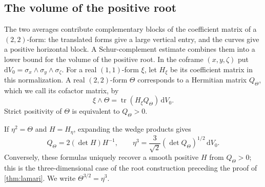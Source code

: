 \subsection{The volume of the positive root}

The two averages contribute complementary blocks of the coefficient matrix of a $(2,2)$-form: the translated forms give a large vertical entry, and the curves give a positive horizontal block. A Schur-complement estimate combines them into a lower bound for the volume of the positive root. In the coframe $(x,y,\zeta)$ put
$\mathrm{d}V_0=\sigma_x\wedge\sigma_y\wedge\sigma_\zeta$. For a real $(1,1)$-form $\xi$, let $H_\xi$ be its coefficient matrix in this normalization. A real $(2,2)$-form $\Theta$ corresponds to a Hermitian matrix $Q_\Theta$, which we call its cofactor matrix, by
\[
 \xi\wedge\Theta=\operatorname{tr}(H_\xi Q_\Theta)\,\mathrm{d}V_0.
\]
Strict positivity of $\Theta$ is equivalent to $Q_\Theta>0$.

If $\eta^2=\Theta$ and $H=H_\eta$, expanding the wedge products gives
\[
 Q_\Theta=2(\det H)H^{-1},\qquad
 \eta^3=\frac{3}{\sqrt2}(\det Q_\Theta)^{1/2}\,\mathrm{d}V_0.
\]
Conversely, these formulas uniquely recover a smooth positive $H$ from $Q_\Theta>0$; this is the three-dimensional case of the root construction preceding the proof of \cref{thm:lamari}. We write $\Theta^{3/2}=\eta^3$.

